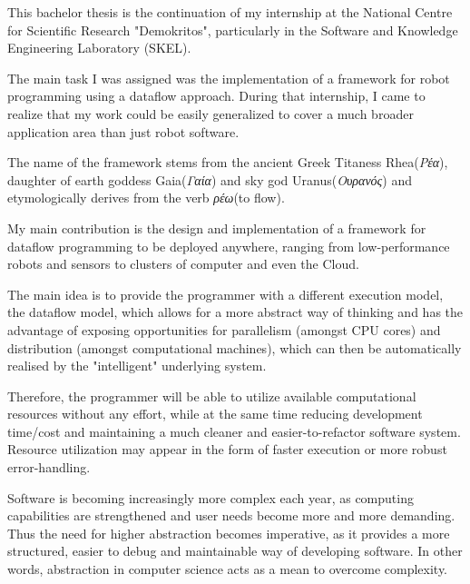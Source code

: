 \documentclass{dithesis}
\begin{document}
\tableofcontents
\listoffigures

\begin{thesisprologue}[Prologue]

This bachelor thesis is the continuation of my internship at the National Centre for Scientific Research "Demokritos", particularly in the Software and Knowledge Engineering Laboratory (SKEL). 

The main task I was assigned was the implementation of a framework for robot programming using a dataflow approach. During that internship, I came to realize that my work could be easily generalized to cover a much broader application area than just robot software. 

The name of the framework stems from the ancient Greek Titaness Rhea(\textit{Ρέα}), daughter of earth goddess Gaia(\textit{Γαία}) and sky god Uranus(\textit{Ουρανός}) and etymologically derives from the verb \textit{ρέω}(to flow).

\end{thesisprologue}



My main contribution is the design and implementation of a framework for dataflow programming to be deployed anywhere, ranging from low-performance robots and sensors to clusters of computer and even the Cloud. 

The main idea is to provide the programmer with a different execution model, the dataflow model, which allows for a more abstract way of thinking and has the advantage of exposing opportunities for parallelism (amongst CPU cores) and distribution (amongst computational machines), which can then be automatically realised by the "intelligent" underlying system. 

Therefore, the programmer will be able to utilize available computational resources without any effort, while at the same time reducing development time/cost and maintaining a much cleaner and easier-to-refactor software system. Resource utilization may appear in the form of faster execution or more robust error-handling. 




Software is becoming increasingly more complex each year, as computing capabilities are strengthened and user needs become more and more demanding. Thus the need for higher abstraction becomes imperative, as it provides a more structured, easier to debug and maintainable way of developing software. In other words, abstraction in computer science acts as a mean to overcome complexity. 
\end{document}
